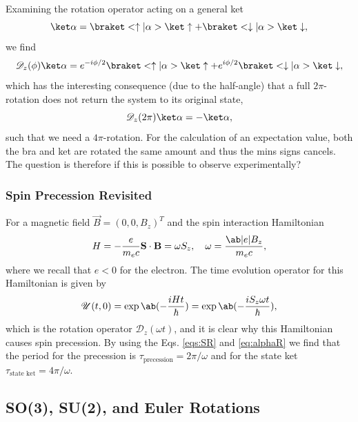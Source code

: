 Examining the rotation operator acting on a general ket
\begin{equation}
    \ket\alpha = \bk{\uparrow}{\alpha} \ket\uparrow + \bk{\downarrow}{\alpha}\ket\downarrow,
\end{equation}
we find 
\begin{equation}
    \mathscr{D}_{z}(\phi)\ket\alpha = e^{-i\phi/2}\bk{\uparrow}{\alpha} \ket\uparrow + e^{i\phi/2}\bk{\downarrow}{\alpha}\ket\downarrow,\label{eq:alphaR}
\end{equation}
which has the interesting consequence (due to the half-angle) that a full $2\pi$-rotation does not return the system to its original state, 
\begin{equation}
    \mathscr{D}_z(2\pi)\ket\alpha = -\ket\alpha,
\end{equation}
such that we need a $4\pi$-rotation. For the calculation of an expectation value, both the bra and ket are rotated the same amount and thus the mins signs cancels. The question is therefore if this is possible to observe experimentally?

\subsubsection{Spin Precession Revisited}
For a magnetic field $\vec{B} = (0, 0, B_z)^T$ and the spin interaction Hamiltonian
\begin{equation}
    H = -\frac{e}{m_e c} \vec{S} \cdot \vec{B} = \omega S_z, \quad \omega = \frac{\abs{e} B_z}{m_e c},
\end{equation}
where we recall that $e < 0$ for the electron. The time evolution operator for this Hamiltonian is given by
\begin{equation}
    \mathscr{U}(t,0) = \exp\ab( - \frac{i H t}{\hbar}) = \exp\ab( - \frac{iS_z \omega t}{\hbar}),
\end{equation}
which is the rotation operator $\mathscr{D}_z(\omega t)$, and it is clear why this Hamiltonian causes spin precession. By using the Eqs. \eqref{eqs:SR} and \eqref{eq:alphaR} we find that the period for the precession is $\tau_\text{precession} = 2\pi /\omega$ and for the state ket $\tau_\text{state ket} = 4\pi/\omega$.


\subsection{SO(3), SU(2), and Euler Rotations}

